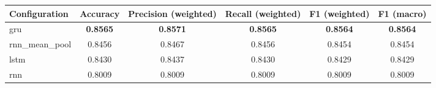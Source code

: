 \begin{tabular}{lccccc}
\hline
Configuration & Accuracy & Precision (weighted) & Recall (weighted) & F1 (weighted) & F1 (macro) \\
\hline
gru & \textbf{0.8565} & \textbf{0.8571} & \textbf{0.8565} & \textbf{0.8564} & \textbf{0.8564} \\
rnn\_mean\_pool & 0.8456 & 0.8467 & 0.8456 & 0.8454 & 0.8454 \\
lstm & 0.8430 & 0.8437 & 0.8430 & 0.8429 & 0.8429 \\
rnn & 0.8009 & 0.8009 & 0.8009 & 0.8009 & 0.8009 \\
\hline
\end{tabular}
